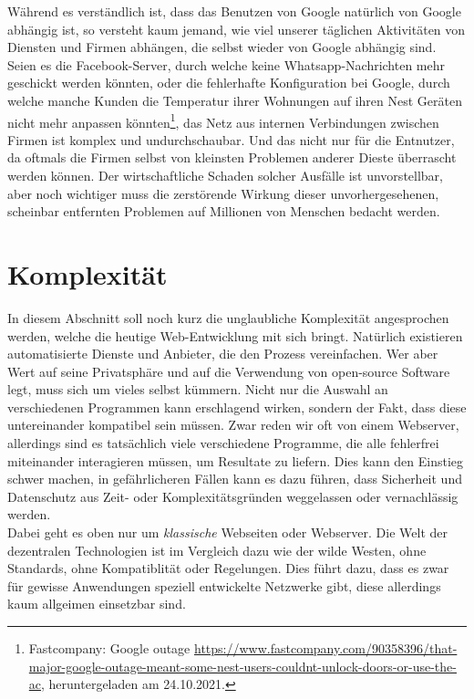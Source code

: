 \documentclass[a4paper,11pt,titlepage,twoside]{memoir}
\begin{document}
\noindent Während es verständlich ist, dass das Benutzen von Google
natürlich von Google abhängig ist, so versteht kaum jemand, wie viel
unserer täglichen Aktivitäten von Diensten und Firmen abhängen, die
selbst wieder von Google abhängig sind. Seien es die Facebook-Server,
durch welche keine Whatsapp-Nachrichten mehr geschickt werden könnten,
oder die fehlerhafte Konfiguration bei Google, durch welche manche
Kunden die Temperatur ihrer Wohnungen auf ihren Nest Geräten nicht
mehr anpassen könnten\footnote{Fastcompany: Google outage
\url{https://www.fastcompany.com/90358396/that-major-google-outage-meant-some-nest-users-couldnt-unlock-doors-or-use-the-ac},
heruntergeladen am 24.10.2021.}, das Netz aus internen Verbindungen
zwischen Firmen ist komplex und undurchschaubar. Und das nicht nur für
die Entnutzer, da oftmals die Firmen selbst von kleinsten Problemen
anderer Dieste überrascht werden können. Der wirtschaftliche Schaden
solcher Ausfälle ist unvorstellbar, aber noch wichtiger muss die
zerstörende Wirkung dieser unvorhergesehenen, scheinbar entfernten
Problemen auf Millionen von Menschen bedacht werden.
\section{Komplexität}
\label{sec:org81735b9}
In diesem Abschnitt soll noch kurz die unglaubliche Komplexität
angesprochen werden, welche die heutige Web-Entwicklung mit sich
bringt. Natürlich existieren automatisierte Dienste und Anbieter, die
den Prozess vereinfachen. Wer aber Wert auf seine Privatsphäre und auf
die Verwendung von open-source Software legt, muss sich um vieles
selbst kümmern. Nicht nur die Auswahl an verschiedenen Programmen kann
erschlagend wirken, sondern der Fakt, dass diese untereinander
kompatibel sein müssen. Zwar reden wir oft von einem Webserver,
allerdings sind es tatsächlich viele verschiedene Programme, die alle
fehlerfrei miteinander interagieren müssen, um Resultate zu liefern.
Dies kann den Einstieg schwer machen, in gefährlicheren Fällen kann es
dazu führen, dass Sicherheit und Datenschutz aus Zeit- oder
Komplexitätsgründen weggelassen oder vernachlässig werden.\\

\noindent Dabei geht es oben nur um \emph{klassische} Webseiten oder
Webserver. Die Welt der dezentralen Technologien ist im Vergleich dazu
wie der wilde Westen, ohne Standards, ohne Kompatiblität oder
Regelungen. Dies führt dazu, dass es zwar für gewisse Anwendungen
speziell entwickelte Netzwerke gibt, diese allerdings kaum allgeimen
einsetzbar sind.
\end{document}
